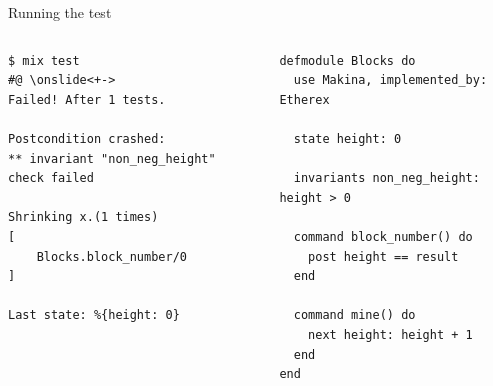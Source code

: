 \documentclass[aspectratio=169, 10pt, handout]{beamer}
\begin{document}
\begin{frame}[label={sec:org501af93},fragile]{Running the test}
 \begin{columns}
\begin{column}{0.48\columnwidth}
\onslide<+->
\lstset{language=bash,label= ,caption= ,captionpos=b,numbers=none,style=shell}
\begin{lstlisting}
$ mix test
#@ \onslide<+->
Failed! After 1 tests.

Postcondition crashed:
** invariant "non_neg_height" check failed

Shrinking x.(1 times)
[
    Blocks.block_number/0
]

Last state: %{height: 0}
\end{lstlisting}
\end{column}

\begin{column}{0.48\columnwidth}
\lstset{language=elixir,label= ,caption= ,captionpos=b,numbers=none,style=display}
\begin{lstlisting}
defmodule Blocks do
  use Makina, implemented_by: Etherex

  state height: 0

  invariants non_neg_height: height > 0

  command block_number() do
    post height == result
  end

  command mine() do
    next height: height + 1
  end
end
\end{lstlisting}
\end{column}
\end{columns}
\end{frame}
\end{document}
